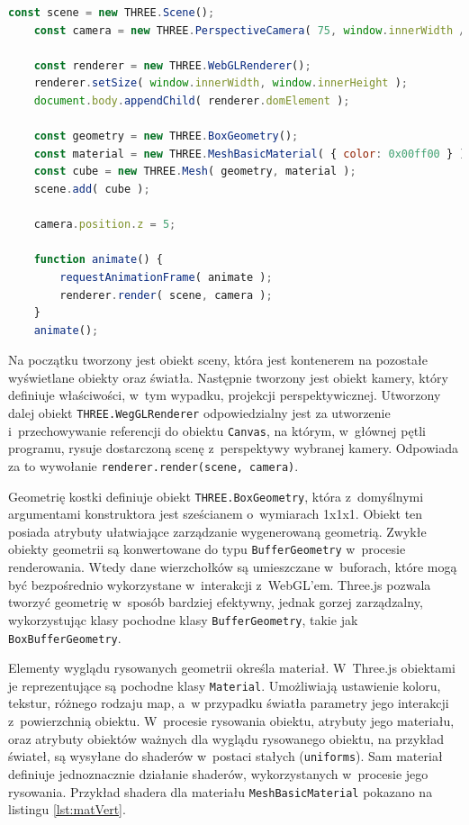 \begin{lstlisting}[float=h,language=javascript, label={lst:threejs:base}, caption={Hello World w~świecie grafiki 3D}]
    const scene = new THREE.Scene();
    const camera = new THREE.PerspectiveCamera( 75, window.innerWidth / window.innerHeight, 0.1, 1000 );
    
    const renderer = new THREE.WebGLRenderer();
    renderer.setSize( window.innerWidth, window.innerHeight );
    document.body.appendChild( renderer.domElement );

    const geometry = new THREE.BoxGeometry();
    const material = new THREE.MeshBasicMaterial( { color: 0x00ff00 } );
    const cube = new THREE.Mesh( geometry, material );
    scene.add( cube );

    camera.position.z = 5;

    function animate() {
        requestAnimationFrame( animate );
        renderer.render( scene, camera );
    }
    animate();
\end{lstlisting}

Na początku tworzony jest obiekt sceny, która jest kontenerem na pozostałe wyświetlane obiekty oraz światła. Następnie tworzony jest obiekt kamery, który definiuje właściwości, w~tym wypadku, projekcji perspektywicznej. Utworzony dalej obiekt \texttt{THREE.WegGLRenderer} odpowiedzialny jest za utworzenie i~przechowywanie referencji do obiektu \texttt{Canvas}, na którym, w~głównej pętli programu, rysuje dostarczoną scenę z~perspektywy wybranej kamery. Odpowiada za to wywołanie \texttt{renderer.render(scene, camera)}.

Geometrię kostki definiuje obiekt \texttt{THREE.BoxGeometry}, która z~domyślnymi argumentami konstruktora jest sześcianem o~wymiarach 1x1x1. Obiekt ten posiada atrybuty ułatwiające zarządzanie wygenerowaną geometrią. Zwykłe obiekty geometrii są konwertowane do typu \texttt{BufferGeometry} w~procesie renderowania. Wtedy dane wierzchołków są umieszczane w~buforach, które mogą być bezpośrednio wykorzystane w~interakcji z~WebGL'em. Three.js pozwala tworzyć geometrię w~sposób bardziej efektywny, jednak gorzej zarządzalny, wykorzystując klasy pochodne klasy \texttt{BufferGeometry}, takie jak \texttt{BoxBufferGeometry}.

Elementy wyglądu rysowanych geometrii określa materiał. W~Three.js obiektami je reprezentujące są pochodne klasy \texttt{Material}. Umożliwiają ustawienie koloru, tekstur, różnego rodzaju map, a~w przypadku światła parametry jego interakcji z~powierzchnią obiektu. W~procesie rysowania obiektu, atrybuty jego materiału, oraz atrybuty obiektów ważnych dla wyglądu rysowanego obiektu, na przykład świateł, są wysyłane do shaderów w~postaci stałych (\texttt{uniforms}). Sam materiał definiuje jednoznacznie działanie shaderów, wykorzystanych w~procesie jego rysowania. Przykład shadera dla materiału \texttt{MeshBasicMaterial} pokazano na listingu \ref{lst:matVert}.

